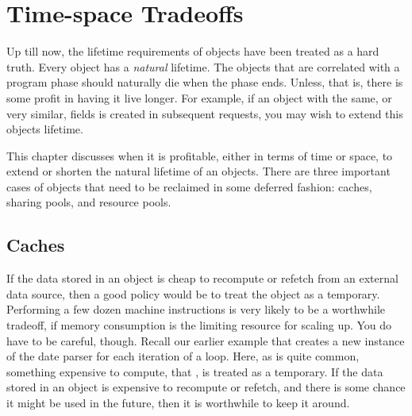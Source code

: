 



\chapter{Time-space Tradeoffs}
\label{balance-time-and-space}
\label{chapter:time-space-tradeoffs}



Up till now, the lifetime requirements of objects have been treated as a hard
truth. Every object has a \emph{natural} lifetime.
The objects that are correlated with a program phase should naturally die when
the phase ends. Unless, that is, there is some profit in having it live longer.
For example, if an object with the same, or very similar, fields is created in
subsequent requests, you may wish to extend this objects lifetime.


This chapter discusses when it is profitable, either in terms of time or space,
to extend or shorten the natural lifetime of an objects. There are three
important cases of objects that need to be reclaimed in some deferred fashion:
caches, sharing pools, and resource pools.


\section{Caches}
\label{sec:caches}

If the data stored in an object is cheap to recompute or refetch from an
external data source, then a good policy would be to treat the object as a
temporary. Performing a few dozen machine instructions is very likely to be a
worthwhile tradeoff, if memory consumption is the limiting resource for
scaling up. 
You do have to be careful, though. Recall our earlier example that creates a new
instance of the date parser  for each iteration of a
loop. Here, as is quite common, something expensive to compute, that
, is treated as a temporary. If the data stored in an
object is expensive to recompute or refetch, and there is some chance it might
be used in the future, then it is worthwhile to keep it around.

